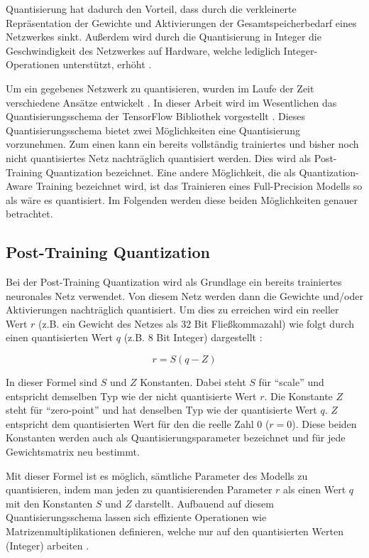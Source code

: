 Quantisierung hat dadurch den Vorteil, dass durch die verkleinerte Repräsentation der Gewichte und Aktivierungen der Gesamtspeicherbedarf eines Netzwerkes sinkt. Außerdem wird durch die Quantisierung in Integer die Geschwindigkeit des Netzwerkes auf Hardware, welche lediglich Integer-Operationen unterstützt, erhöht \cite{jacob_quantization_2017}.

Um ein gegebenes Netzwerk zu quantisieren, wurden im Laufe der Zeit verschiedene Ansätze entwickelt \cite{guo_survey_2018}. In dieser Arbeit wird im Wesentlichen das Quantisierungsschema der TensorFlow Bibliothek vorgestellt \cite{jacob_quantization_2017}. Dieses Quantisierungsschema bietet zwei Möglichkeiten eine Quantisierung vorzunehmen. Zum einen kann ein bereits vollständig trainiertes und bisher noch nicht quantisiertes Netz nachträglich quantisiert werden. Dies wird als Post-Training Quantization bezeichnet. Eine andere Möglichkeit, die als Quantization-Aware Training bezeichnet wird, ist das Trainieren eines Full-Precision Modells so als wäre es quantisiert. Im Folgenden werden diese beiden Möglichkeiten genauer betrachtet.


\subsection{Post-Training Quantization}
\label{post-training-quantization}
Bei der Post-Training Quantization wird als Grundlage ein bereits trainiertes neuronales Netz verwendet. Von diesem Netz werden dann die Gewichte und/oder Aktivierungen nachträglich quantisiert. Um dies zu erreichen wird ein reeller Wert $r$ (z.B. ein Gewicht des Netzes als 32 Bit Fließkommazahl) wie folgt durch einen quantisierten Wert $q$ (z.B. 8 Bit Integer) dargestellt \cite{jacob_quantization_2017}:

\begin{equation}
r = S (q - Z)
\label{eq2.7}
\end{equation}

In dieser Formel sind $S$ und $Z$ Konstanten. Dabei steht $S$ für "`scale"' und entspricht demselben Typ wie der nicht quantisierte Wert $r$. Die Konstante $Z$ steht für "`zero-point"' und hat denselben Typ wie der quantisierte Wert $q$. $Z$ entspricht dem quantisierten Wert für den die reelle Zahl 0 ($r = 0$). Diese beiden Konstanten werden auch als Quantisierungsparameter bezeichnet und für jede Gewichtsmatrix neu bestimmt.

Mit dieser Formel ist es möglich, sämtliche Parameter des Modells zu quantisieren, indem man jeden zu quantisierenden Parameter $r$ als einen Wert $q$ mit den Konstanten $S$ und $Z$ darstellt. Aufbauend auf diesem Quantisierungsschema lassen sich effiziente Operationen wie Matrizenmultiplikationen definieren, welche nur auf den quantisierten Werten (Integer) arbeiten \cite{jacob_quantization_2017}.

